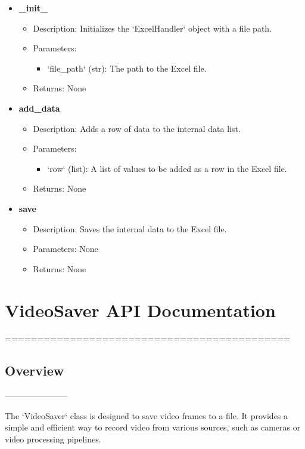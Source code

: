 \documentclass{article}
\begin{document}
\begin{itemize}
    \item \textbf{\_init\_}
        \begin{itemize}
            \item Description: Initializes the `ExcelHandler` object with a file path.
            \item Parameters:
                \begin{itemize}
                    \item {`file\_path` (str):} The path to the Excel file.
                \end{itemize}
            \item Returns: None
        \end{itemize}
    \item \textbf{add\_data}
        \begin{itemize}
            \item Description: Adds a row of data to the internal data list.
            \item Parameters:
                \begin{itemize}
                    \item `row` (list): A list of values to be added as a row in the Excel file.
                \end{itemize}
            \item Returns: None
        \end{itemize}
    \item \textbf{save}
        \begin{itemize}
            \item Description: Saves the internal data to the Excel file.
            \item Parameters: None
            \item Returns: None
        \end{itemize}
\end{itemize}


\section{VideoSaver API Documentation}
============================================

\subsection{Overview}
-----------------------

The `VideoSaver` class is designed to save video frames to a file. It provides a simple and efficient way to record video from various sources, such as cameras or video processing pipelines.
\end{document}
